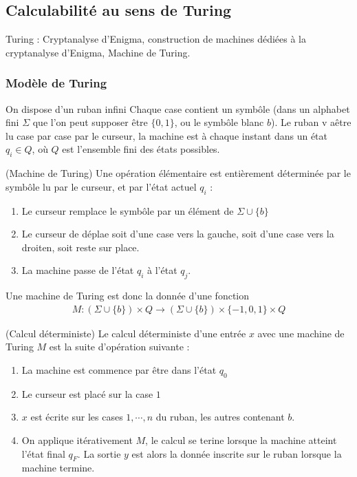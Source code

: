         \subsection{Calculabilité au sens de Turing}
            Turing : Cryptanalyse d'Enigma, construction de machines dédiées à la cryptanalyse d'Enigma, Machine de Turing.
            
            \subsubsection{Modèle de Turing}
                On dispose d'un ruban infini
                Chaque case contient un symbôle (dans un alphabet fini $\Sigma$ que l'on peut supposer être $\{0, 1\}$, ou le symbôle blanc $b$). Le ruban v aêtre lu case par case par le curseur, la machine est à chaque instant dans un état $q_i \in Q$, où $Q$ est l'ensemble fini des états possibles.
                \begin{defi} (Machine de Turing)
                    Une opération élémentaire est entièrement déterminée par le symbôle lu par le curseur, et par l'état actuel $q_i$ :
                    \begin{enumerate}
                        \item Le curseur remplace le symbôle par un élément de $\Sigma \cup \{b\}$
                        \item Le curseur de déplae soit d'une case vers la gauche, soit d'une case vers la droiten, soit reste sur place.
                        \item La machine passe de l'état $q_i$ à l'état $q_j$.
                    \end{enumerate}
                    Une machine de Turing est donc la donnée d'une fonction
                    \begin{align*}
                        M : (\Sigma \cup \{b\}) \times Q \to (\Sigma \cup \{b\}) \times \{-1, 0, 1\} \times Q
                    \end{align*}
                \end{defi}
                \begin{defi} (Calcul déterministe)
                    Le calcul déterministe d'une entrée $x$ avec une machine de Turing $M$ est la suite d'opération suivante :
                    \begin{enumerate}
                        \item La machine est commence par être dans l'état $q_0$
                        \item Le curseur est placé sur la case $1$
                        \item $x$ est écrite sur les cases $1, \cdots, n$ du ruban, les autres contenant $b$.
                        \item On applique itérativement $M$, le calcul se terine lorsque la machine atteint l'état final $q_F$. La sortie $y$ est alors la donnée inscrite sur le ruban lorsque la machine termine.
                    \end{enumerate}
                \end{defi}

